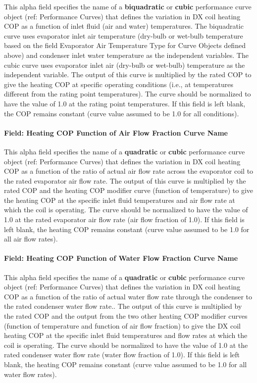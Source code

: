 This alpha field specifies the name of a \textbf{biquadratic} or \textbf{cubic} performance curve object (ref: Performance Curves) that defines the variation in DX coil heating COP as a function of inlet fluid (air and water) temperatures. The biquadratic curve uses evaporator inlet air temperature (dry-bulb or wet-bulb temperature based on the field Evaporator Air Temperature Type for Curve Objects defined above) and condenser inlet water temperature as the independent variables. The cubic curve uses evaporator inlet air (dry-bulb or wet-bulb) temperature as the independent variable. The output of this curve is multiplied by the rated COP to give the heating COP at specific operating conditions (i.e., at temperatures different from the rating point temperatures). The curve should be normalized to have the value of 1.0 at the rating point temperatures. If this field is left blank, the COP remains constant (curve value assumed to be 1.0 for all conditions).

\paragraph{Field: Heating COP Function of Air Flow Fraction Curve Name}\label{field-heating-cop-function-of-air-flow-fraction-curve-name}

This alpha field specifies the name of a \textbf{quadratic} or \textbf{cubic} performance curve object (ref: Performance Curves) that defines the variation in DX coil heating COP as a function of the ratio of actual air flow rate across the evaporator coil to the rated evaporator air flow rate. The output of this curve is multiplied by the rated COP and the heating COP modifier curve (function of temperature) to give the heating COP at the specific inlet fluid temperatures and air flow rate at which the coil is operating. The curve should be normalized to have the value of 1.0 at the rated evaporator air flow rate (air flow fraction of 1.0). If this field is left blank, the heating COP remains constant (curve value assumed to be 1.0 for all air flow rates).

\paragraph{Field: Heating COP Function of Water Flow Fraction Curve Name}\label{field-heating-cop-function-of-water-flow-fraction-curve-name}

This alpha field specifies the name of a \textbf{quadratic} or \textbf{cubic} performance curve object (ref: Performance Curves) that defines the variation in DX coil heating COP as a function of the ratio of actual water flow rate through the condenser to the rated condenser water flow rate.. The output of this curve is multiplied by the rated COP and the output from the two other heating COP modifier curves (function of temperature and function of air flow fraction) to give the DX coil heating COP at the specific inlet fluid temperatures and flow rates at which the coil is operating. The curve should be normalized to have the value of 1.0 at the rated condenser water flow rate (water flow fraction of 1.0). If this field is left blank, the heating COP remains constant (curve value assumed to be 1.0 for all water flow rates).

